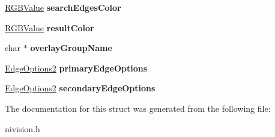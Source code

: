 \begin{DoxyCompactItemize}
\item 
\hypertarget{structFindTransformRectsOptions2__struct_a9551d3bc6d07fb40fe7e36b222e0ebc7}{
\hyperlink{structRGBValue__struct}{RGBValue} {\bfseries searchEdgesColor}}
\label{structFindTransformRectsOptions2__struct_a9551d3bc6d07fb40fe7e36b222e0ebc7}

\item 
\hypertarget{structFindTransformRectsOptions2__struct_a6d9a846655618846d2de014989fb1a4c}{
\hyperlink{structRGBValue__struct}{RGBValue} {\bfseries resultColor}}
\label{structFindTransformRectsOptions2__struct_a6d9a846655618846d2de014989fb1a4c}

\item 
\hypertarget{structFindTransformRectsOptions2__struct_a323cd04f4d25781eb5077d067ff4c9a2}{
char $\ast$ {\bfseries overlayGroupName}}
\label{structFindTransformRectsOptions2__struct_a323cd04f4d25781eb5077d067ff4c9a2}

\item 
\hypertarget{structFindTransformRectsOptions2__struct_ab93fc8846508974ba07db684c35fa65c}{
\hyperlink{structEdgeOptions2__struct}{EdgeOptions2} {\bfseries primaryEdgeOptions}}
\label{structFindTransformRectsOptions2__struct_ab93fc8846508974ba07db684c35fa65c}

\item 
\hypertarget{structFindTransformRectsOptions2__struct_a036dfd3be017c08e6bbbe9f454d0317d}{
\hyperlink{structEdgeOptions2__struct}{EdgeOptions2} {\bfseries secondaryEdgeOptions}}
\label{structFindTransformRectsOptions2__struct_a036dfd3be017c08e6bbbe9f454d0317d}

\end{DoxyCompactItemize}


The documentation for this struct was generated from the following file:\begin{DoxyCompactItemize}
\item 
nivision.h\end{DoxyCompactItemize}
